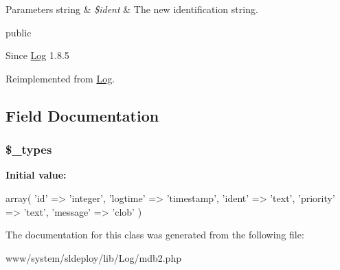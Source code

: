 \begin{DoxyParams}[1]{Parameters}
string & {\em \$ident} & The new identification string.\\
\hline
\end{DoxyParams}
public \begin{DoxySince}{Since}
\hyperlink{class_log}{Log} 1.8.5 
\end{DoxySince}


Reimplemented from \hyperlink{class_log_a9d8352d257344340d7a5b9c081d2a0d9}{Log}.



\subsection{Field Documentation}
\hypertarget{class_log__mdb2_a81beea6863217fb7878986676569faef}{
\subsubsection[{\$\_\-types}]{\setlength{\rightskip}{0pt plus 5cm}\$\_\-types}}
\label{class_log__mdb2_a81beea6863217fb7878986676569faef}
{\bfseries Initial value:}
\begin{DoxyCode}
 array(
        'id'        => 'integer',
        'logtime'   => 'timestamp',
        'ident'     => 'text',
        'priority'  => 'text',
        'message'   => 'clob'
    )
\end{DoxyCode}


The documentation for this class was generated from the following file:\begin{DoxyCompactItemize}
\item 
www/system/sldeploy/lib/Log/mdb2.php\end{DoxyCompactItemize}
